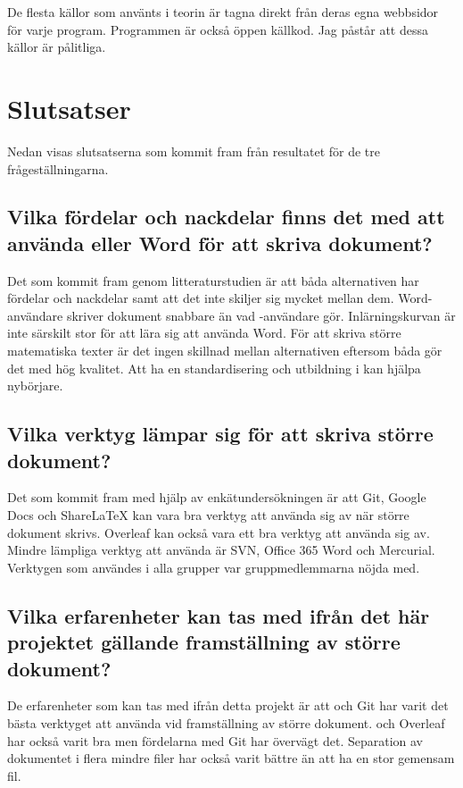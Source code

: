 De flesta källor som använts i teorin är tagna direkt från deras egna webbsidor för varje program. Programmen är också öppen källkod. Jag påstår att dessa källor är pålitliga.

\section{Slutsatser}
\label{sec:conclusions-tuhkala}
Nedan visas slutsatserna som kommit fram från resultatet för de tre frågeställningarna.

\subsection{Vilka fördelar och nackdelar finns det med att använda \latex eller Word för att skriva dokument?}
Det som kommit fram genom litteraturstudien är att båda alternativen har fördelar och nackdelar samt att det inte skiljer sig mycket mellan dem. Word-användare skriver dokument snabbare än vad \latex-användare gör. Inlärningskurvan är inte särskilt stor för att lära sig att använda Word. För att skriva större matematiska texter är det ingen skillnad mellan alternativen eftersom båda gör det med hög kvalitet. Att ha en standardisering och utbildning i \latex kan hjälpa nybörjare.

\subsection{Vilka verktyg lämpar sig för att skriva större dokument?}
Det som kommit fram med hjälp av enkätundersökningen är att Git, Google Docs och ShareLaTeX kan vara bra verktyg att använda sig av när större dokument skrivs. Overleaf kan också vara ett bra verktyg att använda sig av. Mindre lämpliga verktyg att använda är SVN, Office 365 Word och Mercurial. Verktygen som användes i alla grupper var gruppmedlemmarna nöjda med.

\subsection{Vilka erfarenheter kan tas med ifrån det här projektet gällande framställning av större dokument?}
De erfarenheter som kan tas med ifrån detta projekt är att \latex och Git har varit det bästa verktyget att använda vid framställning av större dokument. \latex och Overleaf har också varit bra men fördelarna med Git har övervägt det. Separation av dokumentet i flera mindre filer har också varit bättre än att ha en stor gemensam fil.

